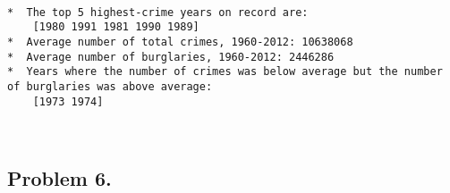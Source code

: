 \documentclass[11pt]{article}
\begin{document}
    \begin{center}
    \end{center}
    { \hspace*{\fill} \\}
    
    \begin{Verbatim}[commandchars=\\\{\}]
*  The top 5 highest-crime years on record are:
	[1980 1991 1981 1990 1989]
*  Average number of total crimes, 1960-2012: 10638068
*  Average number of burglaries, 1960-2012: 2446286
*  Years where the number of crimes was below average but the number of burglaries was above average:
	[1973 1974]

    \end{Verbatim}

    \begin{center}
    \end{center}
    { \hspace*{\fill} \\}
    
    \subsection*{Problem 6.}\label{problem-6.}
\end{document}
